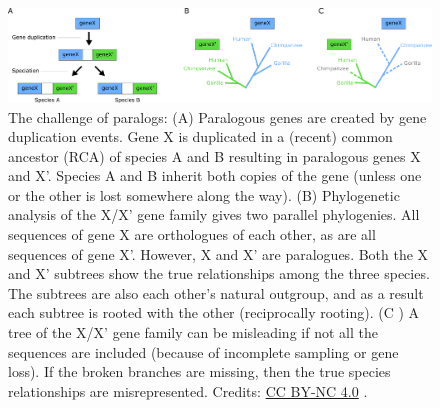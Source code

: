 \begin{figure}[!htbp]
\centering
\includegraphics[width=1\linewidth]{files/ortho-para-df6a4f2e797aa9f7fb70f004212067f5.pdf}
\caption[]{The challenge of paralogs: (A) Paralogous genes are created by gene duplication events.
Gene X is duplicated in a (recent) common ancestor (RCA) of species A and B resulting in paralogous genes X and X'.
Species A and B inherit both copies of the gene (unless one or the other is lost somewhere along the way).
(B) Phylogenetic analysis of the X/X' gene family gives two parallel phylogenies.
All sequences of gene X are orthologues of each other, as are all sequences of gene X'.
However, X and X' are paralogues.
Both the X and X' subtrees show the true relationships among the three species.
The subtrees are also each other's natural outgroup, and as a result each subtree is rooted with the other (reciprocally rooting).
(C ) A tree of the X/X' gene family can be misleading if not all the sequences are included (because of incomplete sampling or gene loss).
If the broken branches are missing, then the true species relationships are misrepresented.
Credits: \href{https://creativecommons.org/licenses/by-nc/4.0/}{CC BY-NC 4.0} \cite{own_3_2024}.}
\label{ortho_para}
\end{figure}


